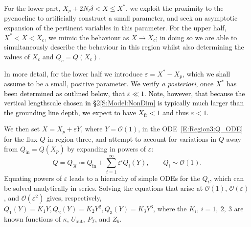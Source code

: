 \documentclass[openacc]{rsproca_new}%
\newcommand{\order}[1]{\mathcal{O}(#1)}
\newcommand{\red}[1]{{\color{red} #1}}
\newcommand{\blue}[1]{{\color{blue} #1}}
\newcommand{\rout}[1]{\red{\st{#1}}}\newcommand{\ab}[1]{\textcolor{Green}{#1}}\newcommand{\about}[1]{\textcolor{Cyan}{\sout{#1}}}
\renewcommand{\rout}[1]{{}} %
\renewcommand{\blue}[1]{{\textcolor{black}{#1}}} %
\renewcommand{\red}[1]{{}} %
\newcommand{\lt}{\delta} %
\newcommand{\Pt}{\textit{P}_T}
\renewcommand{\in}{\text{in}} %
\newcommand{\out}{\text{out}}
\begin{document}
For the lower part, $X_p  + 2N_l \lt < X \leq X^*$, we exploit the proximity to the pycnocline to artificially construct a small parameter, and seek an asymptotic expansion of the pertinent variables in this parameter. For the upper half, $X^* < X < X_c$, we mimic the behaviour as $X \to X_c$; in doing so we are able to simultaneously describe the behaviour in this region whilst also determining the values of $X_c$ and $Q_c = Q(X_c)$.

In more detail, for the lower half we introduce $\varepsilon = X^* - X_p$,
which we \rout{consider} \blue{shall assume} to be a small, positive parameter. \blue{We verify \textit{a posteriori}, once $X^*$ has been determined as outlined below, that $\varepsilon \ll 1$. Note, however, that because the vertical lengthscale chosen in \S2\ref{S:Model:NonDim} is typically much larger than the grounding line depth, we expect to have $X_{\text{fr}} < 1$ and thus $\varepsilon < 1$. } 

We then set $X = X_p + \varepsilon Y$, where  $Y = \order{1}$, in the ODE~\eqref{E:Region3:Q_ODE} for the flux $Q$ in region three, and attempt to account for variations in $Q$ away from $Q_{\text{in}} = Q(X_p)$ by expanding in powers of $\varepsilon$:
\begin{equation}\label{E:MeltRate:Q_expansionR3}
Q = Q_{3l} \coloneqq   Q_\in  + \sum_{i = 1}^{\infty} \varepsilon^i Q_i(Y), \qquad Q_i \sim \order{1}.
 \end{equation}
Equating powers of $\varepsilon$ leads to a hierarchy of simple ODEs for the $Q_i$, which can be solved analytically in series. Solving the equations that arise at $\order{1}$, $\order{\varepsilon}$, and $\order{\varepsilon^2}$ gives, respectively, $
Q_1(Y) = K_1 Y,  Q_2(Y) = K_2 Y^2,  Q_3(Y) =K_3 Y^3$, where the $K_i$, $i = 1,~2,~3$ are known functions of $\kappa$, $U_{\text{out}}$, $P_T$, and $Z_b$.

\end{document}
